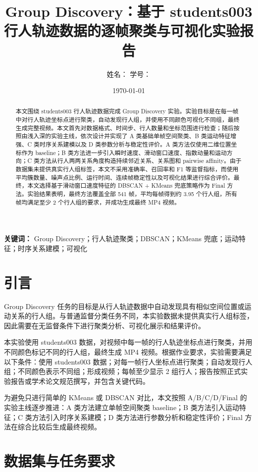 \documentclass[UTF8,a4paper,12pt]{ctexart}
\title{\textbf{Group Discovery：基于 students003 行人轨迹数据的逐帧聚类与可视化实验报告}}
\author{姓名： \quad 学号：}
\date{\today}
\begin{document}
\maketitle

\begin{abstract}
本文围绕 students003 行人轨迹数据完成 Group Discovery 实验。实验目标是在每一帧中对行人轨迹坐标点进行聚类，自动发现行人组，并使用不同颜色可视化不同组，最终生成完整视频。本文首先对数据格式、时间步、行人数量和坐标范围进行检查；随后按照由浅入深的实验主线，依次设计并实现了 A 类基础单帧空间聚类、B 类运动特征增强、C 类时序关系建模以及 D 类参数分析与稳定性评价。A 类方法仅使用二维位置坐标作为 baseline；B 类方法进一步引入瞬时速度、滑动窗口速度、指数动量和运动方向；C 类方法从行人两两关系角度构造持续邻近关系、关系图和 pairwise affinity。由于数据集未提供真实行人组标签，本文不采用准确率、召回率和 F1 等监督指标，而使用平均簇数量、噪声点比例、运行时间、连续帧稳定性以及可视化结果进行综合评价。最终，本文选择基于滑动窗口速度特征的 DBSCAN + KMeans 兜底策略作为 Final 方法。实验结果表明，最终方法覆盖全部 541 帧，平均每帧得到约 3.95 个行人组，所有帧均满足至少 2 个行人组的要求，并成功生成最终 MP4 视频。
\end{abstract}

\noindent\textbf{关键词：} Group Discovery；行人轨迹聚类；DBSCAN；KMeans 兜底；运动特征；时序关系建模；可视化

\newpage
\tableofcontents
\newpage

\section{引言}

Group Discovery 任务的目标是从行人轨迹数据中自动发现具有相似空间位置或运动关系的行人组。与普通监督分类任务不同，本实验数据未提供真实行人组标签，因此需要在无监督条件下进行聚类分析、可视化展示和结果评价。

本实验使用 students003 数据，对视频中每一帧的行人轨迹坐标点进行聚类，并用不同颜色标记不同的行人组，最终生成 MP4 视频。根据作业要求，实验需要满足以下条件：使用 students003 数据；对每一帧行人坐标点进行聚类；自动发现行人组；不同颜色表示不同组；形成视频；每帧至少显示 2 组行人；报告按照正式实验报告或学术论文规范撰写，并包含关键代码。

为避免只进行简单的 KMeans 或 DBSCAN 对比，本文按照 A/B/C/D/Final 的实验主线逐步推进：A 类方法建立单帧空间聚类 baseline；B 类方法引入运动特征；C 类方法引入时序关系建模；D 类方法进行参数分析和稳定性评价；Final 方法在综合比较后生成最终视频。

\section{数据集与任务要求}
\end{document}
